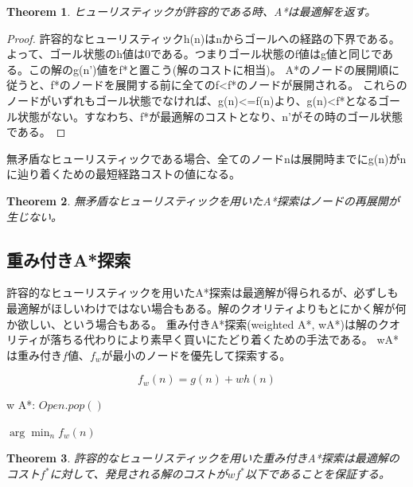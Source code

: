 \documentclass[b5paper]{report}
\newtheorem{theorem}{Theorem}
\begin{document}
\begin{theorem}
ヒューリスティックが許容的である時、A*は最適解を返す。
\end{theorem}
\begin{proof}

許容的なヒューリスティックh(n)はnからゴールへの経路の下界である。よって、ゴール状態のh値は0である。つまりゴール状態のf値はg値と同じである。この解のg(n')値をf*と置こう(解のコストに相当)。
A*のノードの展開順に従うと、f*のノードを展開する前に全てのf<f*のノードが展開される。
これらのノードがいずれもゴール状態でなければ、g(n)<=f(n)より、g(n)<f*となるゴール状態がない。すなわち、f*が最適解のコストとなり、n'がその時のゴール状態である。

\end{proof}



無矛盾なヒューリスティックである場合、全てのノードnは展開時までにg(n)がnに辿り着くための最短経路コストの値になる。

\begin{theorem}
無矛盾なヒューリスティックを用いたA*探索はノードの再展開が生じない。
\end{theorem}





\subsection{重み付きA*探索}
\label{sec:weighted-astar-search}

許容的なヒューリスティックを用いたA*探索は最適解が得られるが、必ずしも最適解がほしいわけではない場合もある。解のクオリティよりもとにかく解が何か欲しい、という場合もある。
重み付きA*探索(weighted A*, wA*)は解のクオリティが落ちる代わりにより素早く買いにたどり着くための手法である。
wA*は重み付き$f$値、$f_w$が最小のノードを優先して探索する。

\begin{equation}
	f_w(n) = g(n) + w h(n)
\end{equation}

\begin{algorithm}
\caption{w A*: $Open.pop()$}
\label{alg:wastar-open}
	\Return $\arg \min_n f_w(n)$
\end{algorithm}


\begin{theorem}
許容的なヒューリスティックを用いた重み付きA*探索は最適解のコスト$f^*$に対して、発見される解のコストが$w f^*$以下であることを保証する。
\end{theorem}
\end{document}
